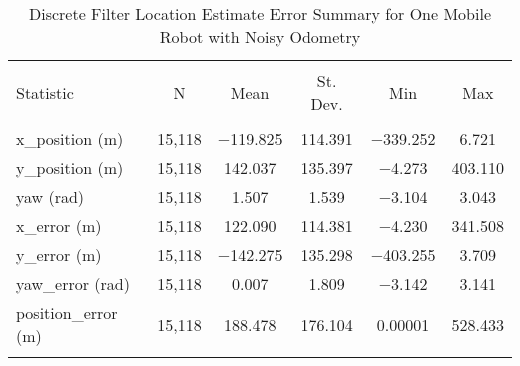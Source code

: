 
\begin{table}[!htbp] \centering 
  \caption{Discrete Filter Location Estimate Error Summary for One Mobile Robot with Noisy Odometry} 
  \label{tab:one_mobile_no_gps_discrete_summary} 
\begin{tabular}{@{\extracolsep{5pt}}lccccc} 
\\[-1.8ex]\hline 
\hline \\[-1.8ex] 
Statistic & \multicolumn{1}{c}{N} & \multicolumn{1}{c}{Mean} & \multicolumn{1}{c}{St. Dev.} & \multicolumn{1}{c}{Min} & \multicolumn{1}{c}{Max} \\ 
\hline \\[-1.8ex] 
x\_position (m) & 15,118 & \num{-119.825} & \num{114.391} & \num{-339.252} & \num{6.721} \\ 
y\_position (m) & 15,118 & \num{142.037} & \num{135.397} & \num{-4.273} & \num{403.110} \\ 
yaw (rad) & 15,118 & \num{1.507} & \num{1.539} & \num{-3.104} & \num{3.043} \\ 
x\_error (m) & 15,118 & \num{122.090} & \num{114.381} & \num{-4.230} & \num{341.508} \\ 
y\_error (m) & 15,118 & \num{-142.275} & \num{135.298} & \num{-403.255} & \num{3.709} \\ 
yaw\_error (rad) & 15,118 & \num{0.007} & \num{1.809} & \num{-3.142} & \num{3.141} \\ 
position\_error (m) & 15,118 & \num{188.478} & \num{176.104} & \num{0.00001} & \num{528.433} \\ 
\hline \\[-1.8ex] 
\end{tabular} 
\end{table} 
